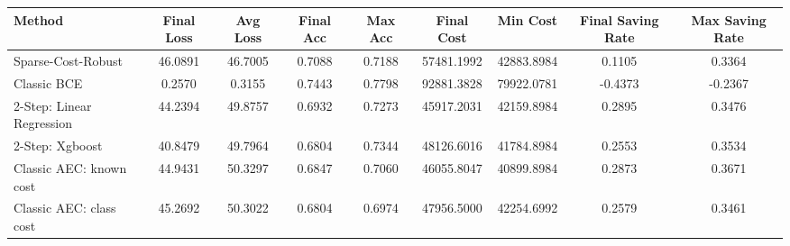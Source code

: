 \begin{tabular}{lcccccccc}
\toprule
Method & Final Loss & Avg Loss & Final Acc & Max Acc & Final Cost & Min Cost & Final Saving Rate & Max Saving Rate \\
\midrule
Sparse-Cost-Robust & 46.0891 & 46.7005 & 0.7088 & 0.7188 & 57481.1992 & 42883.8984 & 0.1105 & 0.3364 \\
Classic BCE & 0.2570 & 0.3155 & 0.7443 & 0.7798 & 92881.3828 & 79922.0781 & -0.4373 & -0.2367 \\
2-Step: Linear Regression & 44.2394 & 49.8757 & 0.6932 & 0.7273 & 45917.2031 & 42159.8984 & 0.2895 & 0.3476 \\
2-Step: Xgboost & 40.8479 & 49.7964 & 0.6804 & 0.7344 & 48126.6016 & 41784.8984 & 0.2553 & 0.3534 \\
Classic AEC: known cost & 44.9431 & 50.3297 & 0.6847 & 0.7060 & 46055.8047 & 40899.8984 & 0.2873 & 0.3671 \\
Classic AEC: class cost & 45.2692 & 50.3022 & 0.6804 & 0.6974 & 47956.5000 & 42254.6992 & 0.2579 & 0.3461 \\
\bottomrule
\end{tabular}
